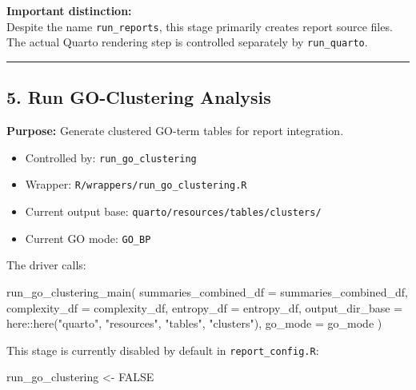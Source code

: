 \documentclass[
  letterpaper,
  DIV=11,
  numbers=noendperiod,
  openany,
  oneside]{scrreprt}
\newenvironment{Shaded}{\begin{snugshade}}{\end{snugshade}}
\newcommand{\AttributeTok}[1]{\textcolor[rgb]{0.40,0.45,0.13}{#1}}
\newcommand{\ConstantTok}[1]{\textcolor[rgb]{0.56,0.35,0.01}{#1}}
\newcommand{\FunctionTok}[1]{\textcolor[rgb]{0.28,0.35,0.67}{#1}}
\newcommand{\NormalTok}[1]{\textcolor[rgb]{0.00,0.23,0.31}{#1}}
\newcommand{\OtherTok}[1]{\textcolor[rgb]{0.00,0.23,0.31}{#1}}
\newcommand{\SpecialCharTok}[1]{\textcolor[rgb]{0.37,0.37,0.37}{#1}}
\newcommand{\StringTok}[1]{\textcolor[rgb]{0.13,0.47,0.30}{#1}}
\providecommand{\tightlist}{%
  \setlength{\itemsep}{0pt}\setlength{\parskip}{0pt}}
\begin{document}
\textbf{Important distinction:}\\
Despite the name \texttt{run\_reports}, this stage primarily creates
report source files. The actual Quarto rendering step is controlled
separately by \texttt{run\_quarto}.

\begin{center}\rule{0.5\linewidth}{0.5pt}\end{center}

\subsection*{5. Run GO-Clustering
Analysis}\label{run-go-clustering-analysis}

\textbf{Purpose:} Generate clustered GO-term tables for report
integration.

\begin{itemize}
\tightlist
\item
  Controlled by: \texttt{run\_go\_clustering}
\item
  Wrapper: \texttt{R/wrappers/run\_go\_clustering.R}
\item
  Current output base: \texttt{quarto/resources/tables/clusters/}
\item
  Current GO mode: \texttt{GO\_BP}
\end{itemize}

The driver calls:

\begin{Shaded}
\begin{Highlighting}[]
\FunctionTok{run\_go\_clustering\_main}\NormalTok{(}
  \AttributeTok{summaries\_combined\_df =}\NormalTok{ summaries\_combined\_df,}
  \AttributeTok{complexity\_df =}\NormalTok{ complexity\_df,}
  \AttributeTok{entropy\_df =}\NormalTok{ entropy\_df,}
  \AttributeTok{output\_dir\_base =}\NormalTok{ here}\SpecialCharTok{::}\FunctionTok{here}\NormalTok{(}\StringTok{"quarto"}\NormalTok{, }\StringTok{"resources"}\NormalTok{, }\StringTok{"tables"}\NormalTok{, }\StringTok{"clusters"}\NormalTok{),}
  \AttributeTok{go\_mode =}\NormalTok{ go\_mode}
\NormalTok{)}
\end{Highlighting}
\end{Shaded}

This stage is currently disabled by default in
\texttt{report\_config.R}:

\begin{Shaded}
\begin{Highlighting}[]
\NormalTok{run\_go\_clustering }\OtherTok{\textless{}{-}} \ConstantTok{FALSE}
\end{Highlighting}
\end{Shaded}
\end{document}
